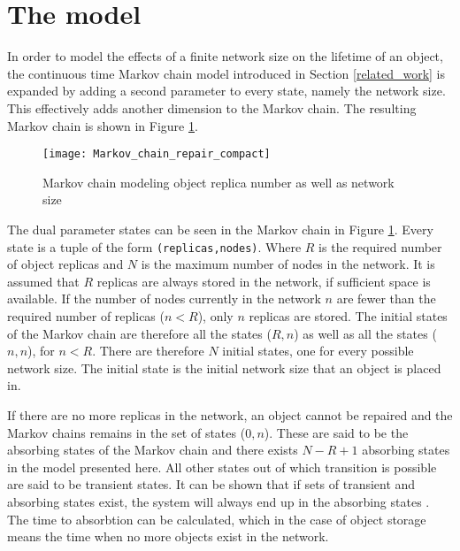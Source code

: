 \section{The model}
\label{model}

In order to model the effects of a finite network size on the lifetime of an object, the continuous time Markov chain model introduced in Section \ref{related_work} is expanded by adding a second parameter to every state, namely the network size. This effectively adds another dimension to the Markov chain. The resulting Markov chain is shown in Figure \ref{fig_markov_chain}.

\begin{figure}[htbp]
 \centering
 \texttt{[image: Markov\_chain\_repair\_compact]}
 \caption{Markov chain modeling object replica number as well as network size}
 \label{fig_markov_chain}
\end{figure}


The dual parameter states can be seen in the Markov chain in Figure \ref{fig_markov_chain}. Every state is a tuple of the form \verb.(replicas,nodes).. Where $R$ is the required number of object replicas and $N$ is the maximum number of nodes in the network. It is assumed that $R$ replicas are always stored in the network, if sufficient space is available. If the number of nodes currently in the network $n$ are fewer than the required number of replicas ($n < R$), only $n$ replicas are stored. The initial states of the Markov chain are therefore all the states ($R,n$) as well as all the states ($n,n$), for $n < R$. There are therefore $N$ initial states, one for every possible network size. The initial state is the initial network size that an object is placed in.

If there are no more replicas in the network, an object cannot be repaired and the Markov chains remains in the set of states ($0,n$). These are said to be the absorbing states of the Markov chain and there exists $N - R + 1$ absorbing states in the model presented here. All other states out of which transition is possible are said to be transient states. It can be shown that if sets of transient and absorbing states exist, the system will always end up in the absorbing states \cite{grinstead1997introduction_probability}. The time to absorbtion can be calculated, which in the case of object storage means the time when no more objects exist in the network.

